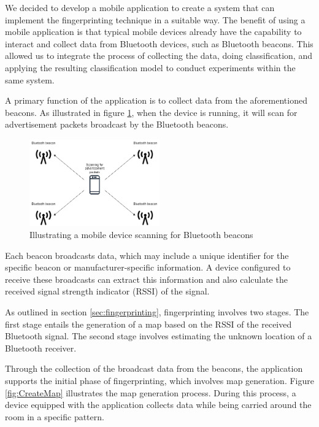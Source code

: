 We decided to develop a mobile application to create a system that can implement the fingerprinting technique in a suitable way.
The benefit of using a mobile application is that typical mobile devices already have the capability to interact and collect data from Bluetooth devices, such as Bluetooth beacons. 
This allowed us to integrate the process of collecting the data, doing classification, and applying the resulting classification model to conduct experiments within the same system.

A primary function of the application is to collect data from the aforementioned beacons. 
As illustrated in figure \ref{fig:ScanAdvertisement}, when the device is running, it will scan for advertisement packets broadcast by the Bluetooth beacons.

\begin{figure}[H]
    \centering
    \includegraphics[width=0.5\textwidth]{images/ScanningForAdvertisement.drawio.png}
    \caption{Illustrating a mobile device scanning for Bluetooth beacons}
    \label{fig:ScanAdvertisement}
\end{figure}

Each beacon broadcasts data, which may include a unique identifier for the specific beacon or manufacturer-specific information.
A device configured to receive these broadcasts can extract this information and also calculate the received signal strength indicator (RSSI) of the signal.

As outlined in section \ref{sec:fingerprinting}, fingerprinting involves two stages.
The first stage entails the generation of a map based on the RSSI of the received Bluetooth signal. The second stage involves estimating the unknown location of a Bluetooth receiver.

Through the collection of the broadcast data from the beacons, the application supports the initial phase of fingerprinting, which involves map generation.
Figure \ref{fig:CreateMap} illustrates the map generation process. During this process, a device equipped with the application collects data while being carried around the room in a specific pattern.


